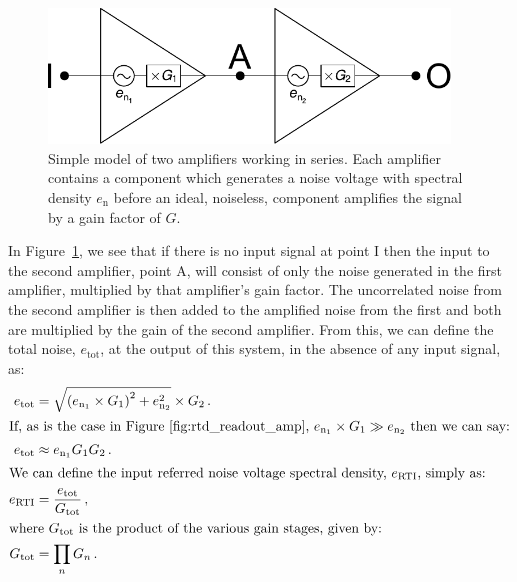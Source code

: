 \begin{figure}[ht]
\begin{center}
\includegraphics[width = 0.95\textwidth]{figures/amp_noise_model.pdf}
\caption[Noise model of series amplifiers]{Simple model of two amplifiers working in series. Each amplifier contains a component which generates a noise voltage with spectral density $e_{\mathrm{n}}$ before an ideal, noiseless, component amplifies the signal by a gain factor of $G$.}
\label{fig:series_amp_model}
\end{center}
\end{figure}
\par 
In Figure~\ref{fig:series_amp_model}, we see that if there is no input signal at point I then the input to the second amplifier, point A, will consist of only the noise generated in the first amplifier, multiplied by that amplifier's gain factor. The uncorrelated noise from the second amplifier is then added to the amplified noise from the first and both are multiplied by the gain of the second amplifier. From this, we can define the total noise, $e_{\mathrm{tot}}$, at the output of this system, in the absence of any input signal, as:
\begin{align}
e_{\mathrm{tot}} &= \sqrt{\left(e_{\mathrm{n_{1}}} \times G_{1}\right)^{2} + e_{\mathrm{n_{2}}}^{2}} \times G_{2}\, . \label{eqn:total_series_amp_noise}\\
\intertext{If, as is the case in Figure~\ref{fig:rtd_readout_amp}, $e_{\mathrm{n_{1}}} \times G_{1} \gg e_{\mathrm{n_{2}}}$ then we can say:}
e_{\mathrm{tot}} &\approx e_{\mathrm{n_{1}}} G_{1} G_{2}\, . \label{eqn:approx__series_amp_noise} \\
\intertext{We can define the input referred noise voltage spectral density, $e_{\mathrm{RTI}}$, simply as:}
e_{\mathrm{RTI}} &= \frac{e_{\mathrm{tot}}}{G_{\mathrm{tot}}}\, , \label{eqn:noise_RTI} \\
\intertext{where $G_{\mathrm{tot}}$ is the product of the various gain stages, given by:}
G_{\mathrm{tot}} &= \prod_{n} G_{n}\, . \label{eqn:total_gain}
\end{align}
